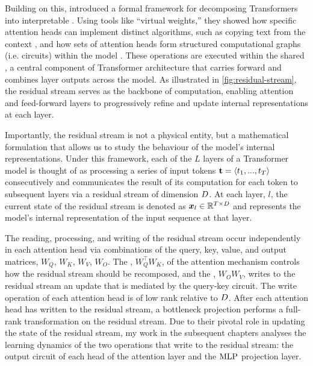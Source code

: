 Building on this, \citet{elhage2021mathematical} introduced a formal framework for decomposing Transformers into interpretable . Using tools like “virtual weights,” they showed how specific attention heads can implement distinct algorithms, such as copying text from the context \citep{olsson2022inductionheads}, and how sets of attention heads form structured computational graphs (i.e. circuits) within the model \citep{ameisen2025circuit}. These operations are executed within the shared , a central component of Transformer architecture that carries forward and combines layer outputs across the model. As illustrated in \cref{fig:residual-stream}, the residual stream serves as the backbone of computation, enabling attention and feed-forward layers to progressively refine and update internal representations at each layer. 
 
Importantly, the residual stream is not a physical entity, but a mathematical formulation that allows us to study the behaviour of the model's internal representations. Under this framework, each of the $L$ layers of a Transformer model is thought of as processing a series of input tokens $\boldsymbol{\mathrm{t}} = \langle t_1, ..., t_T\rangle$ consecutively and communicates the result of its computation for each token to subsequent layers via a residual stream of dimension $D$. At each layer, $l$, the current state of the residual stream is denoted as $\boldsymbol{x}_l \in \mathbb{R}^{T \times D}$ and represents the model's internal representation of the input sequence at that layer.

The reading, processing, and writing of the residual stream occur independently in each attention head via combinations of the query, key, value, and output matrices, $W_Q$, $W_K$, $W_V$, $W_O$. The , $W_Q^{\top}W_K$, of the attention mechanism controls how the residual stream should be recomposed, and the , $W_OW_V$, writes to the residual stream an update that is mediated by the query-key circuit. The write operation of each attention head is of low rank relative to $D$. After each attention head has written to the residual stream, a bottleneck  projection performs a full-rank transformation on the residual stream. Due to their pivotal role in updating the state of the residual stream, my work in the subsequent chapters analyses the learning dynamics of the two operations that write to the residual stream: the output circuit of each head of the attention layer and the $\mathrm{MLP}$ projection layer.

